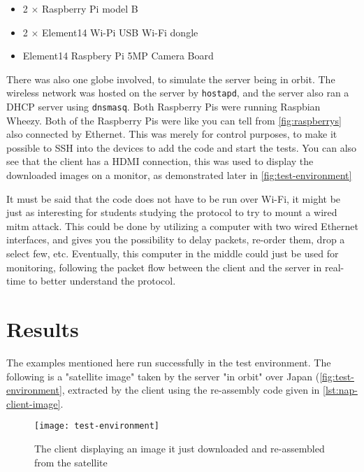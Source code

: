 \begin{itemize}
    \item 2 $\times$ Raspberry Pi model B
    \item 2 $\times$ Element14 Wi-Pi USB Wi-Fi dongle
    \item Element14 Raspbery Pi 5MP Camera Board
\end{itemize}

There was also one globe involved, to simulate the server being in orbit. The wireless network was hosted on the server by \texttt{hostapd}, and the server also ran a DHCP server using \texttt{dnsmasq}. Both Raspberry Pis were running Raspbian Wheezy. Both of the Raspberry Pis were like you can tell from \autoref{fig:raspberrys} also connected by Ethernet. This was merely for control purposes, to make it possible to SSH into the devices to add the code and start the tests. You can also see that the client has a HDMI connection, this was used to display the downloaded images on a monitor, as demonstrated later in \autoref{fig:test-environment}

It must be said that the code does not have to be run over Wi-Fi, it might be just as interesting for students studying the protocol to try to mount a wired \gls{mitm} attack. This could be done by utilizing a computer with two wired Ethernet interfaces, and gives you the possibility to delay packets, re-order them, drop a select few, etc. Eventually, this computer in the middle could just be used for monitoring, following the packet flow between the client and the server in real-time to better understand the protocol.


\section{Results}\label{sec:results}

The examples mentioned here run successfully in the test environment. The following is a "satellite image" taken by the server "in orbit" over Japan (\autoref{fig:test-environment}, extracted by the client using the re-assembly code given in \autoref{lst:nap-client-image}.

\begin{figure}[ht!]
\centering
    \texttt{[image: test-environment]}
    \caption{The client displaying an image it just downloaded and re-assembled from the satellite}\label{fig:test-environment}
\end{figure}

